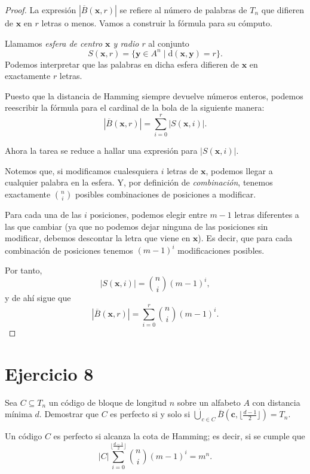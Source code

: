 \begin{proof}
	La expresión $|\overline{B}(\textbf{x}, r)|$ se refiere al número de palabras de $T_n$ que difieren de $\textbf{x}$ en $r$ letras o menos. Vamos a construir la fórmula para su cómputo.
	
	Llamamos \textit{esfera de centro $\textbf{x}$ y radio $r$} al conjunto
	\[S(\textbf{x}, r) = \{\textbf{y}\in A^n\mid\mathrm{d}(\textbf{x},\textbf{y}) = r\}.\]
	Podemos interpretar que las palabras en dicha esfera difieren de $\textbf{x}$ en exactamente $r$ letras.
	
	Puesto que la distancia de Hamming siempre devuelve números enteros, podemos reescribir la fórmula para el cardinal de la bola de la siguiente manera:
	\[|\overline{B}(\textbf{x}, r)| = \sum_{i=0}^r|S(\textbf{x}, i)|.\]
	
	Ahora la tarea se reduce a hallar una expresión para $|S(\textbf{x}, i)|$.
	
	Notemos que, si modificamos cualesquiera $i$ letras de $\textbf{x}$, podemos llegar a cualquier palabra en la esfera. Y, por definición de \textit{combinación}, tenemos exactamente $\binom{n}{i}$ posibles combinaciones de posiciones a modificar.
	
	Para cada una de las $i$ posiciones, podemos elegir entre $m-1$ letras diferentes a las que cambiar (ya que no podemos dejar ninguna de las posiciones sin modificar, debemos descontar la letra que viene en $\textbf{x}$). Es decir, que para cada combinación de posiciones tenemos $(m-1)^i$ modificaciones posibles.
	
	Por tanto,
	\[|S(\textbf{x}, i)| = \binom{n}{i}(m-1)^i,\]
	y de ahí sigue que
	\[|\overline{B}(\textbf{x}, r)| = \sum_{i=0}^r\binom{n}{i}(m-1)^i.\]
\end{proof}

\section{Ejercicio 8}

\begin{formulationBox}
	Sea $C\subseteq T_n$ un código de bloque de longitud $n$ sobre un alfabeto $A$ con distancia mínima $d$. Demostrar que $C$ es perfecto si y solo si $\dot{\bigcup}_{c\in C}\overline{B}(\textbf{c}, \lfloor\frac{d-1}{2}\rfloor) = T_n$.
\end{formulationBox}

Un código $C$ es perfecto si alcanza la cota de Hamming; es decir, si se cumple que
\[|C|\sum_{i=0}^{\lfloor\frac{d-1}{2}\rfloor} \binom{n}{i} (m-1)^i = m^n.\]


